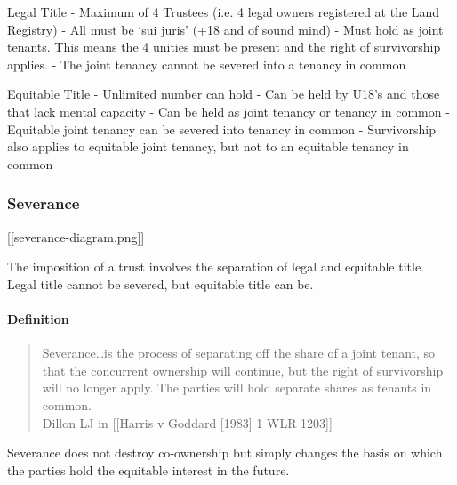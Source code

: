\documentclass[
]{article}
\newenvironment{Shaded}{}{}
\newcommand{\NormalTok}[1]{#1}
\begin{document}
\begin{Shaded}
\begin{Highlighting}[]
\NormalTok{Legal Title}
\NormalTok{{-} Maximum of 4 Trustees (i.e. 4 legal owners registered at the Land Registry)}
\NormalTok{{-} All must be ‘sui juris’ (+18 and of sound mind)}
\NormalTok{{-} Must hold as joint tenants. This means the 4 unities must be present and the right of survivorship applies.}
\NormalTok{{-} The joint tenancy cannot be severed into a tenancy in common}

\NormalTok{Equitable Title}
\NormalTok{{-} Unlimited number can hold}
\NormalTok{{-} Can be held by U18’s and those that lack mental capacity}
\NormalTok{{-} Can be held as joint tenancy or tenancy in common}
\NormalTok{{-} Equitable joint tenancy can be severed into tenancy in common}
\NormalTok{{-} Survivorship also applies to equitable joint tenancy, but not to an equitable tenancy in common}
\end{Highlighting}
\end{Shaded}

\hypertarget{severance}{%
\subsubsection{Severance}\label{severance}}

{[}{[}severance-diagram.png{]}{]}

The imposition of a trust involves the separation of legal and equitable
title. Legal title cannot be severed, but equitable title can be.

\hypertarget{definition-1}{%
\paragraph{Definition}\label{definition-1}}

\begin{quote}
Severance\ldots is the process of separating off the share of a joint
tenant, so that the concurrent ownership will continue, but the right of
survivorship will no longer apply. The parties will hold separate shares
as tenants in common.\\
Dillon LJ in {[}{[}Harris v Goddard {[}1983{]} 1 WLR 1203{]}{]}
\end{quote}

\begin{Shaded}
\begin{Highlighting}[]
\NormalTok{Severance does not destroy co{-}ownership but simply changes the basis on which the parties hold the equitable interest in the future.}
\end{Highlighting}
\end{Shaded}
\end{document}
